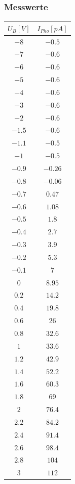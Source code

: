 \subsubsection{Messwerte}
\begin{center}
\begin{longtable}{c|c}
\(U_B [V]\) & \(I_{Pho} [pA]\)\\\hline \endhead
\(-8\) & \( -0.5\) \\ 
\(-7\) & \( -0.6\) \\ 
\(-6\) & \( -0.6\) \\ 
\(-5\) & \( -0.6\) \\ 
\(-4\) & \( -0.6\) \\ 
\(-3\) & \( -0.6\) \\ 
\(-2\) & \( -0.6\) \\ 
\(-1.5\) & \( -0.6\) \\ 
\(-1.1\) & \( -0.5\) \\ 
\(-1\) & \( -0.5\) \\ 
\(-0.9\) & \( -0.26\) \\ 
\(-0.8\) & \( -0.06\) \\ 
\(-0.7\) & \( 0.47\) \\ 
\(-0.6\) & \( 1.08\) \\ 
\(-0.5\) & \( 1.8\) \\ 
\(-0.4\) & \( 2.7\) \\ 
\(-0.3\) & \( 3.9\) \\ 
\(-0.2\) & \( 5.3\) \\ 
\(-0.1\) & \( 7\) \\ 
\(0\) & \( 8.95\) \\ 
\(0.2\) & \( 14.2\) \\ 
\(0.4\) & \( 19.8\) \\ 
\(0.6\) & \( 26\) \\ 
\(0.8\) & \( 32.6\) \\ 
\(1\) & \( 33.6\) \\ 
\(1.2\) & \( 42.9\) \\ 
\(1.4\) & \( 52.2\) \\ 
\(1.6\) & \( 60.3\) \\ 
\(1.8\) & \( 69\) \\ 
\(2\) & \( 76.4\) \\ 
\(2.2\) & \( 84.2\) \\ 
\(2.4\) & \( 91.4\) \\ 
\(2.6\) & \( 98.4\) \\ 
\(2.8\) & \( 104\) \\ 
\(3\) & \( 112\) \\ 

\end{longtable}
\end{center}
